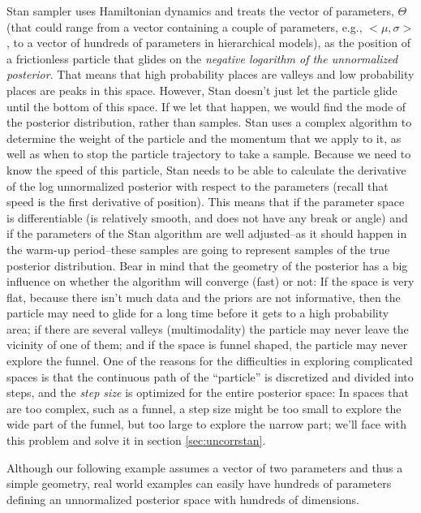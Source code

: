 \documentclass[12pt,]{krantz}
\theoremstyle{definition}
\theoremstyle{definition}
\theoremstyle{definition}
\theoremstyle{remark}
\begin{document}
Stan sampler uses Hamiltonian dynamics and treats the vector of parameters, \(\Theta\) (that could range from a vector containing a couple of parameters, e.g., \(<\mu,\sigma>\), to a vector of hundreds of parameters in hierarchical models), as the position of a frictionless particle that glides on the \emph{negative logarithm of the unnormalized posterior}.
That means that high probability places are valleys and low probability places are peaks in this space. However, Stan doesn't just let the particle glide until the bottom of this space. If we let that happen, we would find the mode of the posterior distribution, rather than samples. Stan uses a complex algorithm to determine the weight of the particle and the momentum that we apply to it, as well as when to stop the particle trajectory to take a sample. Because we need to know the speed of this particle, Stan needs to be able to calculate the derivative of the log unnormalized posterior with respect to the parameters (recall that speed is the first derivative of position). This means that if the parameter space is differentiable (is relatively smooth, and does not have any break or angle) and if the parameters of the Stan algorithm are well adjusted--as it should happen in the warm-up period--these samples are going to represent samples of the true posterior distribution. Bear in mind that the geometry of the posterior has a big influence on whether the algorithm will converge (fast) or not: If the space is very flat, because there isn't much data and the priors are not informative, then the particle may need to glide for a long time before it gets to a high probability area; if there are several valleys (multimodality) the particle may never leave the vicinity of one of them; and if the space is funnel shaped, the particle may never explore the funnel. One of the reasons for the difficulties in exploring complicated spaces is that the continuous path of the ``particle'' is discretized and divided into steps, and the \emph{step size} is optimized for the entire posterior space: In spaces that are too complex, such as a funnel, a step size might be too small to explore the wide part of the funnel, but too large to explore the narrow part; we'll face with this problem and solve it in section \ref{sec:uncorrstan}.

Although our following example assumes a vector of two parameters and thus a simple geometry, real world examples can easily have hundreds of parameters defining an unnormalized posterior space with hundreds of dimensions.
\end{document}
